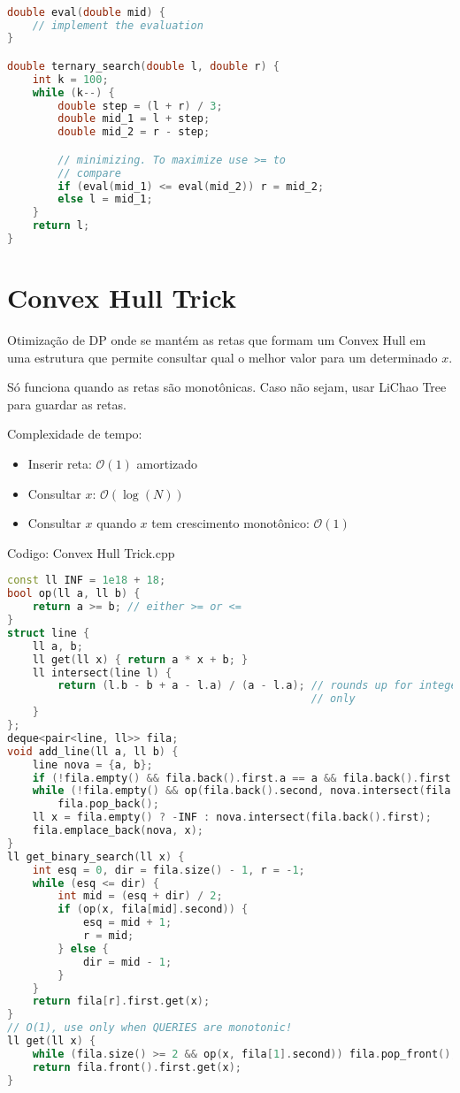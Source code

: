 \documentclass[10pt, a4paper, oneside]{book}
\begin{document}
\begin{lstlisting}[language=C++]

double eval(double mid) {
    // implement the evaluation
}

double ternary_search(double l, double r) {
    int k = 100;
    while (k--) {
        double step = (l + r) / 3;
        double mid_1 = l + step;
        double mid_2 = r - step;

        // minimizing. To maximize use >= to
        // compare
        if (eval(mid_1) <= eval(mid_2)) r = mid_2;
        else l = mid_1;
    }
    return l;
}
\end{lstlisting}
\hfill

\section{Convex Hull Trick}


Otimização de DP onde se mantém as retas que formam um Convex Hull em uma estrutura que permite consultar qual o melhor valor para um determinado \(x\).



Só funciona quando as retas são monotônicas. Caso não sejam, usar LiChao Tree para guardar as retas.



Complexidade de tempo:



\begin{itemize}
\item Inserir reta: $\mathcal{O}(1)$ amortizado
\item Consultar \(x\): $\mathcal{O}(\log(N))$
\item Consultar \(x\) quando \(x\) tem crescimento monotônico: $\mathcal{O}(1)$
\end{itemize}

\hfill

Codigo: Convex Hull Trick.cpp

\begin{lstlisting}[language=C++]
const ll INF = 1e18 + 18;
bool op(ll a, ll b) {
    return a >= b; // either >= or <=
}
struct line {
    ll a, b;
    ll get(ll x) { return a * x + b; }
    ll intersect(line l) {
        return (l.b - b + a - l.a) / (a - l.a); // rounds up for integer
                                                // only
    }
};
deque<pair<line, ll>> fila;
void add_line(ll a, ll b) {
    line nova = {a, b};
    if (!fila.empty() && fila.back().first.a == a && fila.back().first.b == b) return;
    while (!fila.empty() && op(fila.back().second, nova.intersect(fila.back().first)))
        fila.pop_back();
    ll x = fila.empty() ? -INF : nova.intersect(fila.back().first);
    fila.emplace_back(nova, x);
}
ll get_binary_search(ll x) {
    int esq = 0, dir = fila.size() - 1, r = -1;
    while (esq <= dir) {
        int mid = (esq + dir) / 2;
        if (op(x, fila[mid].second)) {
            esq = mid + 1;
            r = mid;
        } else {
            dir = mid - 1;
        }
    }
    return fila[r].first.get(x);
}
// O(1), use only when QUERIES are monotonic!
ll get(ll x) {
    while (fila.size() >= 2 && op(x, fila[1].second)) fila.pop_front();
    return fila.front().first.get(x);
}
\end{lstlisting}
\hfill
\end{document}
